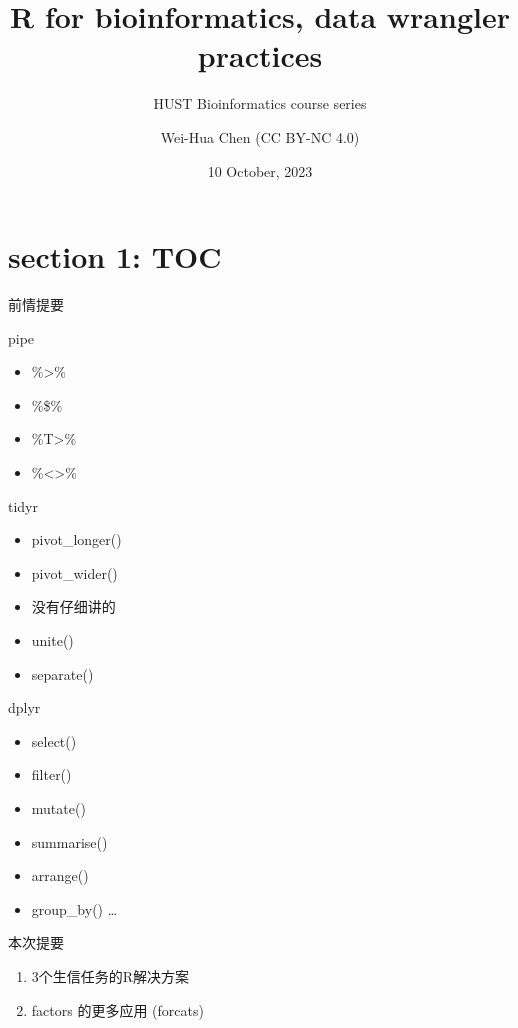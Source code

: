 \documentclass[ignorenonframetext,]{beamer}
\title{R for bioinformatics, data wrangler practices}
\subtitle{HUST Bioinformatics course series}
\author{Wei-Hua Chen (CC BY-NC 4.0)}
\date{10 October, 2023}
\providecommand{\tightlist}{%
  \setlength{\itemsep}{0pt}\setlength{\parskip}{0pt}}
\begin{document}
\frame{\titlepage}

\hypertarget{section-1-toc}{%
\section{section 1: TOC}\label{section-1-toc}}

\begin{frame}{前情提要}
\protect\hypertarget{ux524dux60c5ux63d0ux8981}{}
\begin{block}{pipe}
\protect\hypertarget{pipe}{}
\begin{itemize}
\tightlist
\item
  \%\textgreater\%
\item
  \%\$\%
\item
  \%T\textgreater\%
\item
  \%\textless\textgreater\%
\end{itemize}
\end{block}

\begin{block}{tidyr}
\protect\hypertarget{tidyr}{}
\begin{itemize}
\tightlist
\item
  pivot\_longer()
\item
  pivot\_wider()
\item
  没有仔细讲的
\item
  unite()
\item
  separate()
\end{itemize}
\end{block}

\begin{block}{dplyr}
\protect\hypertarget{dplyr}{}
\begin{itemize}
\tightlist
\item
  select()
\item
  filter()
\item
  mutate()
\item
  summarise()
\item
  arrange()
\item
  group\_by() \ldots{}
\end{itemize}
\end{block}
\end{frame}

\begin{frame}{本次提要}
\protect\hypertarget{ux672cux6b21ux63d0ux8981}{}
\begin{enumerate}
\tightlist
\item
  3个生信任务的R解决方案
\item
  factors 的更多应用 (forcats)
\end{enumerate}
\end{frame}
\end{document}
